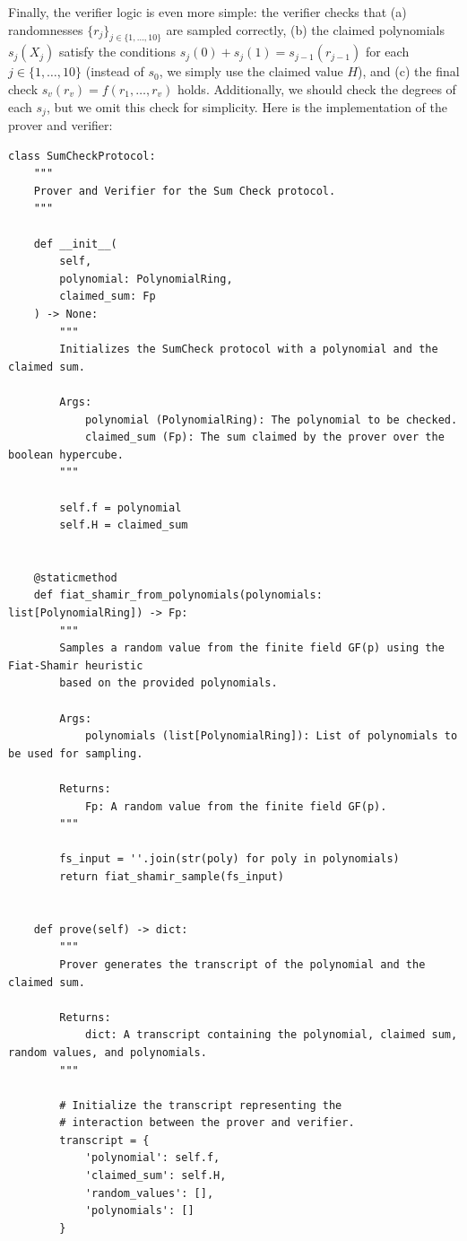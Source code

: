 \documentclass{gkr-template}
\begin{document}
Finally, the verifier logic is even more simple: the verifier checks that (a)
randomnesses $\{r_j\}_{j \in \{1,\dots,10\}}$ are sampled correctly, (b) the
claimed polynomials $s_j(X_j)$ satisfy the conditions $s_j(0) + s_j(1) =
s_{j-1}(r_{j-1})$ for each $j \in \{1,\dots,10\}$ (instead of $s_0$, we simply
use the claimed value $H$), and (c) the final check $s_v(r_v) =
f(r_1,\dots,r_v)$ holds. Additionally, we should check the degrees of each
$s_j$, but we omit this check for simplicity. Here is the implementation of the
prover and verifier:
\begin{verbatim}
class SumCheckProtocol:
    """
    Prover and Verifier for the Sum Check protocol.
    """

    def __init__(
        self, 
        polynomial: PolynomialRing, 
        claimed_sum: Fp
    ) -> None:
        """
        Initializes the SumCheck protocol with a polynomial and the claimed sum.

        Args:
            polynomial (PolynomialRing): The polynomial to be checked.
            claimed_sum (Fp): The sum claimed by the prover over the boolean hypercube.
        """

        self.f = polynomial
        self.H = claimed_sum


    @staticmethod
    def fiat_shamir_from_polynomials(polynomials: list[PolynomialRing]) -> Fp:
        """
        Samples a random value from the finite field GF(p) using the Fiat-Shamir heuristic
        based on the provided polynomials.

        Args:
            polynomials (list[PolynomialRing]): List of polynomials to be used for sampling.

        Returns:
            Fp: A random value from the finite field GF(p).
        """
        
        fs_input = ''.join(str(poly) for poly in polynomials)
        return fiat_shamir_sample(fs_input)


    def prove(self) -> dict:
        """
        Prover generates the transcript of the polynomial and the claimed sum.

        Returns:
            dict: A transcript containing the polynomial, claimed sum, random values, and polynomials.
        """

        # Initialize the transcript representing the 
        # interaction between the prover and verifier.
        transcript = {
            'polynomial': self.f,
            'claimed_sum': self.H,
            'random_values': [],
            'polynomials': []
        }


\end{verbatim}
\end{document}
